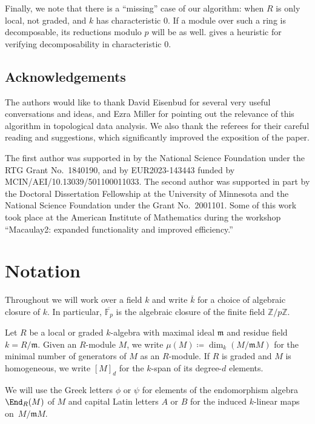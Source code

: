\documentclass[12pt]{amsart}
\def\FF{\mathbb F}
\def\ZZ{\mathbb Z}
\def\m{\mathfrak m}
\theoremstyle{theorem}
\numberwithin{thm}{section}
\theoremstyle{definition}
\begin{document}
Finally, we note that there is a ``missing'' case of our algorithm: when $R$ is only local, not graded, and $k$ has characteristic 0. If a module over such a ring is decomposable, its reductions modulo $p$ will be as well.  gives a heuristic for verifying decomposability in characteristic 0.

\subsection*{Acknowledgements}

The authors would like to thank David Eisenbud for several very useful conversations and ideas, and Ezra Miller for pointing out the relevance of this algorithm in topological data analysis. We also thank the referees for their careful reading and suggestions, which significantly improved the exposition of the paper.

The first author was supported in by the National Science Foundation under the RTG Grant No.~1840190, and by EUR2023-143443 funded by MCIN/AEI/10.13039/501100011033.
The second author was supported in part by the Doctoral Dissertation Fellowship at the University of Minnesota and the National Science Foundation under the Grant No.~2001101. Some of this work took place at the American Institute of Mathematics during the workshop ``Macaulay2: expanded functionality and improved efficiency.''

\section{Notation}

Throughout we will work over a field $k$ and write $\overline k$ for a choice of algebraic closure of $k$. \linebreak In particular, $\overline{\FF_p}$ is the algebraic closure of the finite field $\ZZ/p\ZZ$.

Let $R$ be a local or graded $k$-algebra with maximal ideal $\m$ and residue field $k = R/\m$. Given an $R$-module $M$, we write $\mu(M) \coloneqq \dim_k(M/\m M)$ for the minimal number of generators of $M$ as an $R$-module. If $R$ is graded and $M$ is homogeneous, we write $[M]_d$ for the $k$-span of its degree-$d$ elements.

We will use the Greek letters  $\phi$ or $\psi$ for elements of the endomorphism algebra $\End_R(M)$ of $M$ and capital Latin letters $A$ or $B$ for the induced $k$-linear maps on~$M/\m M$.
\end{document}
